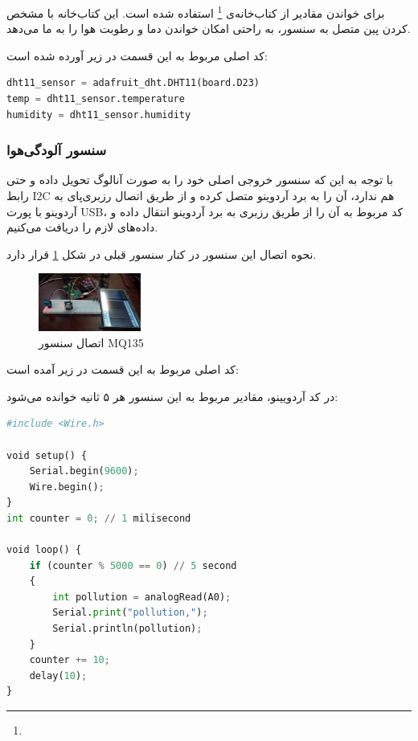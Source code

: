 برای خواندن مقادیر از کتاب‌خانه‌ی 
\footnote{}
استفاده شده است. این کتاب‌خانه با مشخص کردن پین متصل به سنسور، به راحتی امکان خواندن دما و رطوبت هوا را به ما می‌دهد.

کد اصلی مربوط به این قسمت در زیر آورده شده است:

\begin{latin}
\begin{lstlisting}[language=python]
dht11_sensor = adafruit_dht.DHT11(board.D23)
temp = dht11_sensor.temperature
humidity = dht11_sensor.humidity

\end{lstlisting}
\end{latin}

\subsubsection{سنسور آلودگی‌هوا}

با توجه به این که  سنسور  خروجی اصلی خود را به صورت آنالوگ تحویل داده و حتی رابط I2C هم ندارد، آن را به برد آردوینو متصل کرده و از طریق اتصال رزبری‌پای به آردوینو با پورت USB، کد مربوط به آن را از طریق رزبری به برد آردوینو انتقال داده و داده‌های لازم را دریافت می‌کنیم.

نحوه اتصال این سنسور در کنار سنسور قبلی در شکل \ref{fig:3} قرار دارد.

\begin{figure}[ht!]
	\centering
	\includegraphics[width=0.3\textwidth]{figs/dhtmq2.jpg}
	
	\caption{اتصال سنسور MQ135}
	\label{fig:3}
\end{figure}



کد اصلی مربوط به این قسمت در زیر آمده است:


در کد آردویینو، مقادیر مربوط به این سنسور هر ۵ ثانیه خوانده می‌شود:
\begin{latin}
	\begin{lstlisting}[language=python]
#include <Wire.h>

void setup() {
	Serial.begin(9600);
	Wire.begin();
}
int counter = 0; // 1 milisecond

void loop() {	
	if (counter % 5000 == 0) // 5 second
	{
		int pollution = analogRead(A0);
		Serial.print("pollution,");
		Serial.println(pollution);
	} 
	counter += 10;
	delay(10);
}
	\end{lstlisting}
\end{latin}


